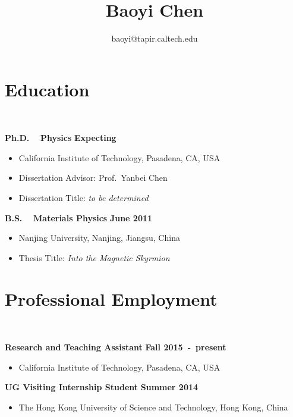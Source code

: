 \documentclass[11pt]{article}
\title{\bfseries\Huge Baoyi Chen}
\author{baoyi@tapir.caltech.edu}
\date{}
\begin{document}
\maketitle


\section*{\sc Education}~
\vspace{-.1in}

{\bf Ph.D.}~~
{\bf Physics}
\hfill{\bf Expecting}
\vspace*{.05in} 
\begin{itemize}
 \item[] California Institute of Technology, Pasadena, CA, USA 
 \item[] Dissertation Advisor: Prof.~Yanbei Chen 
 \item[] Dissertation Title: {\it to be determined}
\end{itemize}
\vspace*{.2in}


{\bf B.S.}~~
{\bf Materials Physics} 
\hfill {\bf June 2011}
\vspace*{.05in} 
\begin{itemize}
 \item[]  Nanjing University, Nanjing, Jiangsu, China 
 \item[] Thesis Title: {\it Into the Magnetic Skyrmion}
\end{itemize}

\vspace{0.8cm}


\section*{\sc Professional Employment}~
\vspace{-.1in}


{\bf Research and Teaching Assistant}
\hfill
{\bf Fall 2015~-~present}
\begin{itemize}
 \item[] California Institute of Technology, Pasadena, CA, USA 
\end{itemize}

\vspace*{.2in}

{\bf UG Visiting Internship Student}
\hfill {\bf Summer 2014}
\begin{itemize}
	\item[]  The Hong Kong University of Science and Technology, Hong Kong, China 
\end{itemize}
\end{document}
